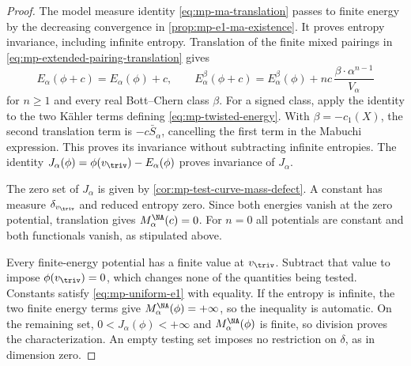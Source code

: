\begin{proof}
The model measure identity \eqref{eq:mp-ma-translation} passes to finite energy by the decreasing convergence in \cref{prop:mp-e1-ma-existence}. It proves entropy invariance, including infinite entropy. Translation of the finite mixed pairings in \eqref{eq:mp-extended-pairing-translation} gives
\[
 E_\alpha(\phi+c)=E_\alpha(\phi)+c,
 \qquad
 E^\beta_\alpha(\phi+c)
   =E^\beta_\alpha(\phi)
      +nc\,\frac{\beta\cdot\alpha^{n-1}}{V_\alpha}
\]
for $n\geq1$ and every real Bott--Chern class $\beta$. For a signed class, apply the identity to the two K\"ahler terms defining \eqref{eq:mp-twisted-energy}. With $\beta=-c_1(X)$, the second translation term is $-c\bar S_\alpha$, cancelling the first term in the Mabuchi expression. This proves its invariance without subtracting infinite entropies. The identity $J_\alpha(\phi)=\phi(v_{\triv})-E_\alpha(\phi)$ proves invariance of $J_\alpha$.

The zero set of $J_\alpha$ is given by \cref{cor:mp-test-curve-mass-defect}. A constant has measure $\delta_{v_{\triv}}$ and reduced entropy zero. Since both energies vanish at the zero potential, translation gives $M_\alpha^{\NA}(c)=0$. For $n=0$ all potentials are constant and both functionals vanish, as stipulated above.

Every finite-energy potential has a finite value at $v_{\triv}$. Subtract that value to impose $\phi(v_{\triv})=0$, which changes none of the quantities being tested. Constants satisfy \eqref{eq:mp-uniform-e1} with equality. If the entropy is infinite, the two finite energy terms give $M_\alpha^{\NA}(\phi)=+\infty$, so the inequality is automatic. On the remaining set, $0<J_\alpha(\phi)<+\infty$ and $M_\alpha^{\NA}(\phi)$ is finite, so division proves the characterization. An empty testing set imposes no restriction on $\delta$, as in dimension zero.
\end{proof}


